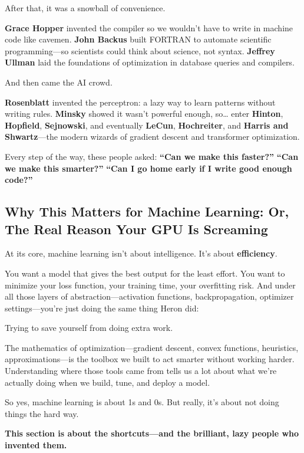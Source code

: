 After that, it was a snowball of convenience.

\textbf{Grace Hopper} invented the compiler so we wouldn’t have to write in machine code like cavemen.  
\textbf{John Backus} built FORTRAN to automate scientific programming—so scientists could think about science, not syntax.  
\textbf{Jeffrey Ullman} laid the foundations of optimization in database queries and compilers.

And then came the AI crowd.

\textbf{Rosenblatt} invented the perceptron: a lazy way to learn patterns without writing rules.  
\textbf{Minsky} showed it wasn’t powerful enough, so… enter \textbf{Hinton}, \textbf{Hopfield}, \textbf{Sejnowski}, and eventually \textbf{LeCun}, \textbf{Hochreiter}, and \textbf{Harris and Shwartz}—the modern wizards of gradient descent and transformer optimization.

Every step of the way, these people asked:  
\textbf{“Can we make this faster?”}  
\textbf{“Can we make this smarter?”}  
\textbf{“Can I go home early if I write good enough code?”}

\subsection{Why This Matters for Machine Learning: Or, The Real Reason Your GPU Is Screaming}

At its core, machine learning isn’t about intelligence. It’s about \textbf{efficiency}.

You want a model that gives the best output for the least effort. You want to minimize your loss function, your training time, your overfitting risk. And under all those layers of abstraction—activation functions, backpropagation, optimizer settings—you’re just doing the same thing Heron did:

Trying to save yourself from doing extra work.

The mathematics of optimization—gradient descent, convex functions, heuristics, approximations—is the toolbox we built to act smarter without working harder. Understanding where those tools came from tells us a lot about what we’re actually doing when we build, tune, and deploy a model.

So yes, machine learning is about 1s and 0s.  
But really, it’s about not doing things the hard way.

\textbf{This section is about the shortcuts—and the brilliant, lazy people who invented them.}
